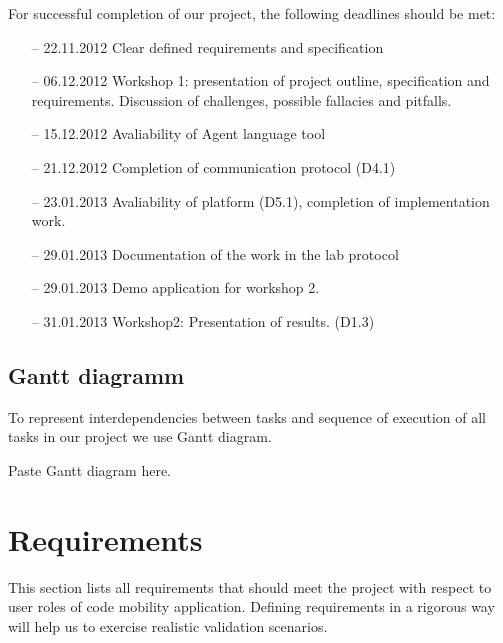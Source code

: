 \documentclass{scrreprt}
\begin{document}
For successful completion of our project, the following deadlines should be met:
\begin{itemize}

\item[--] 22.11.2012 Clear defined requirements and specification
\item[--]{ 06.12.2012 Workshop 1: presentation of project outline, specification and requirements.
	Discussion of challenges, possible fallacies and pitfalls.}
\item[--] 15.12.2012 Avaliability of Agent language tool
\item[--] 21.12.2012 Completion of communication protocol (D4.1)
\item[--] 23.01.2013 Avaliability of platform (D5.1), completion of implementation work.
\item[--] 29.01.2013 Documentation of the work in the lab protocol
\item[--] 29.01.2013 Demo application for workshop 2.
\item[--] 31.01.2013 Workshop2: Presentation of results. (D1.3)
\end{itemize}

	\section{Gantt diagramm}

To represent interdependencies between tasks and sequence of execution of all tasks in our project we use Gantt diagram.


Paste Gantt diagram here.


\chapter{Requirements}

This section lists all requirements that should meet the project with respect to 
user roles of code mobility application.
Defining requirements in a rigorous way will help us to exercise realistic validation scenarios.


\renewcommand{\labelenumi}{R_\arabic{enumi}}
\renewcommand{\labelenumii}{R_\arabic{enumi}_\arabic{enumii}}
\end{document}

